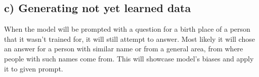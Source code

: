 \documentclass[12pt]{article}
\begin{document}
\subsection*{c) Generating not yet learned data}
When the model will be prompted with a question for a birth place of a person that it wasn't trained for, it will still attempt to answer. Most likely it will chose an answer for a person with similar name or from a general area, from where people with such names come from. This will showcase model's biases and apply it to given prompt.



 
\end{document}
